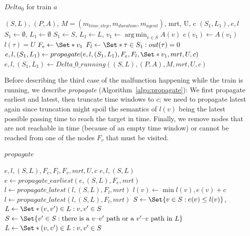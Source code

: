 \documentclass{article}
\DeclareMathOperator*{\argmin}{arg\,min}
\begin{document}
\begin{algorithm}
	\caption{$Delta_0$ for train $a$} \label{algo:Delta0}
	\begin{algorithmic}[1]
		\Require $(S,L)$, $(P,A)$, $M=(m_{time\_step},m_{duration},m_{agent})$, mrt, U, c
	    \Ensure $(S_1,L_1),e,l$
            \State $S_1\leftarrow \emptyset$, $L_1 \leftarrow \emptyset$
            \State $S_1 \leftarrow S$, $L_1 \leftarrow L$,
            \State $v_1 \leftarrow \argmin_{v\in S} A(v)$
            \State $e(v_1) \leftarrow A(v_1)$
                \State $l(\tau)=U$
            \EndFor
            \State $F_e \leftarrow \Set*{v_1}$
            \State $F_l \leftarrow \Set*{\tau \in S_1: out(\tau)=0}$
            \State $e,l,(S_1,L_1) \leftarrow propagate(e,l,(S_1,L_1),F_e,F_l,\Set*{v_1}, mrt, U, c)$
        \Else
            \State $e,l,(S_1,L_1) \leftarrow Delta\_0\_running((S,L), (P,A), M, mrt, U, c)$
        \EndIf
\end{algorithmic}
\end{algorithm}


Before describing the third case of the malfunction happening while the train is running, we describe \emph{propagate} (Algorithm~\ref{algo:propagate}): We first propagate earliest and latest, then truncate time windows to $c$; we need to propagate latest again since truncation might spoil the semantics of $l(v)$ being the latest possible passing time to reach the target in time. Finally, we remove nodes that are not reachable in time (because of an empty time window) or cannot be reached from one of the nodes $F_v$ that must be visited.

\begin{algorithm}
	\caption{$propagate$} \label{algo:propagate}
	\begin{algorithmic}[1]
	    \Require $e,l,(S,L),F_e,F_l,F_v,mrt,U,c$
	    \Ensure $e,l,(S,L)$
	    \State $e \leftarrow propagate\_earliest(e, (S,L), F_e, mrt)$
		\State $l \leftarrow propagate\_latest(l,(S,L),F_l, mrt)$
	        \State $l(v) \leftarrow \min l(v), e(v)+c$
	    \EndFor
	    \State $l \leftarrow propagate\_latest(l,(S,L),F_l, mrt)$
	    \EndIf
		\State $S \leftarrow \Set{v \in S: e(v) \leq l(v)}$, $L \leftarrow \Set*{(v,v^\prime) \in L: v,v^\prime \in S}$
		    \State $S \leftarrow \Set{v^\prime \in S: \textrm{there is a }v\textrm{--}v^\prime\textrm{ path or a }v^\prime\textrm{--}v\textrm{ path in }L}$
		    \State $L \leftarrow \Set*{(v,v^\prime) \in L: v,v^\prime \in S}$
		\EndFor
	\end{algorithmic}
\end{algorithm}
\end{document}
